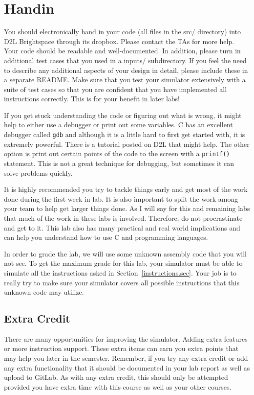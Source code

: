 \documentclass{article}
\begin{document}
\section{Handin}

You should electronically hand in your code (all files in the src/
directory) into D2L Brightspace through its dropbox.
Please contact the TAs for more help.  Your code should be
readable and well-documented. In addition, please turn in additional
test cases that you used in a inputs/ subdirectory. If you feel the
need to describe any additional aspects of your design in detail,
please include these in a separate README. 
Make sure that you test your simulator
extensively with a suite of test cases so that you are confident that
you have implemented all instructions correctly. This is for your
benefit in later labs!  

If you get stuck understanding the code or figuring out what is wrong,
it might help to either use a debugger or print out some variables.  C
has an excellent debugger called \verb+gdb+ and although it is a
little hard to first get started with, it is extremely powerful.
There is a tutorial posted on D2L that might help.  The other option
is print out certain points of the code to the screen with a
\verb+printf()+ statement.  This is not a great technique for
debugging, but sometimes it can solve problems quickly.

It is highly
recommended you try to tackle things early and get most of the work
done during the first week in lab.  It is also important to split the
work among your team to help get larger things done.  
As I will
say for this and remaining labs that much of the work in these labs is
involved.  Therefore, do not procrastinate and get to it.  This lab
also has many practical and real world implications and can help you
understand how
to use C and programming languages.  

In order to grade the lab, we will use some unknown 
assembly code that
you will not see.  To get the maximum grade for this lab, your
simulator must be able to simulate all the instructions asked in
Section~\ref{instructions.sec}.  Your job is to really try to make
sure your simulator covers all possible instructions that this unknown
code may utilize.  

\subsection{Extra Credit}

There are many opportunities for improving the simulator.  Adding
extra features or more instruction support.  These extra items can
earn you extra points that may help you later in the semester.
Remember, if you try any extra credit or add any extra functionality
that it should be documented in your lab report as well as upload to
GitLab.   As with any extra credit, this should only be attempted
provided you have extra time with this course as well as your other
courses.  



\end{document}
